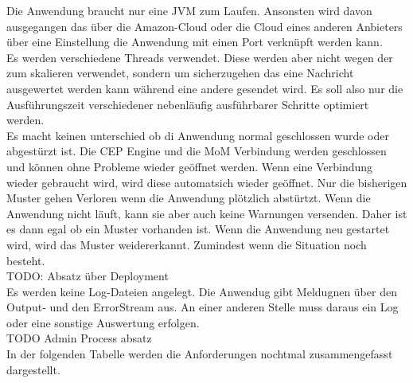 Die Anwendung braucht nur eine JVM zum Laufen. Ansonsten wird davon ausgegangen das über die Amazon-Cloud oder die Cloud eines anderen Anbieters über eine Einstellung die Anwendung mit einen Port verknüpft werden kann. 
\\
Es werden verschiedene Threads verwendet. Diese werden aber nicht wegen der zum skalieren verwendet, sondern um sicherzugehen das eine Nachricht ausgewertet werden kann während eine andere gesendet wird. Es soll also nur die Ausführungszeit verschiedener nebenläufig ausführbarer Schritte optimiert werden. 
\\
Es macht keinen unterschied ob di Anwendung normal geschlossen wurde oder abgestürzt ist. Die CEP Engine und die MoM Verbindung werden geschlossen und können ohne Probleme wieder geöffnet werden. Wenn eine Verbindung wieder gebraucht wird, wird diese automatsich wieder geöffnet. Nur die bisherigen Muster gehen Verloren wenn die Anwendung plötzlich abstürtzt. Wenn die Anwendung nicht läuft, kann sie aber auch keine Warnungen versenden. Daher ist es dann egal ob ein Muster vorhanden ist. Wenn die Anwendung neu gestartet wird, wird das Muster weidererkannt. Zumindest wenn die Situation noch besteht.  
\\
TODO: Absatz über Deployment
\\
Es werden keine Log-Dateien angelegt. Die Anwendug gibt Meldugnen über den Output- und den ErrorStream aus. An einer anderen Stelle muss daraus ein Log oder eine sonstige Auswertung erfolgen. 
\\
TODO Admin Process absatz
\\
In der folgenden Tabelle werden die Anforderungen nochtmal zusammengefasst dargestellt. 

